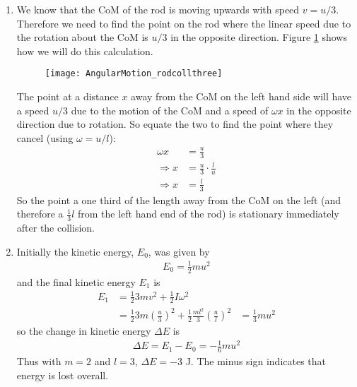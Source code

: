 \begin{hint}
{\begin{enumerate}
\item We know that the CoM of the rod is moving upwards with speed $v=u/3$. Therefore we need to find the point on the rod where the linear speed due to the rotation about the CoM is $u/3$ in the opposite direction. Figure \ref{fig:AngularMotion_rodcollthree} shows how we will do this calculation. 
\begin{figure}[h] 
\centering
\texttt{[image: AngularMotion\_rodcollthree]}
\caption{}
\label{fig:AngularMotion_rodcollthree}
\end{figure}
The point at a distance $x$ away from the CoM on the left hand side will have a speed $u/3$ due to the motion of the CoM and a speed of $\omega x$ in the opposite direction due to rotation. So equate the two to find the point where they cancel (using $\omega=u/l$):
\begin{align*}
\omega x&=\frac{u}{3} \\
\Rightarrow x&=\frac{u}{3}\cdot\frac{l}{u} \\
\Rightarrow x&=\frac{l}{3}
\end{align*}
So the point a one third of the length away from the CoM on the left (and therefore a  $\frac{1}{3}l$ from the left hand end of the rod) is stationary immediately after the collision. 
\item Initially the kinetic energy, $E_0$, was given by
\begin{align*}
E_0=\frac{1}{2}mu^2
\end{align*}
and the final kinetic energy $E_1$ is 
\begin{align*}
E_1&=\frac{1}{2}3mv^2+\frac{1}{2}I\omega^2 \\
&=\frac{1}{2}3m\left(\frac{u}{3}\right)^2+\frac{1}{2}\frac{ml^2}{3}\left(\frac{u}{l}\right)^2
&=\frac{1}{3}mu^2
\end{align*}
so the change in kinetic energy $\Delta E$ is
\begin{align*}
\Delta E=E_1-E_0=-\frac{1}{6}mu^2
\end{align*} 
Thus with $m = 2$ and $l = 3$, $\Delta E = - 3$ J. The minus sign indicates that energy is lost overall. 
\end{enumerate}
}
\end{hint}